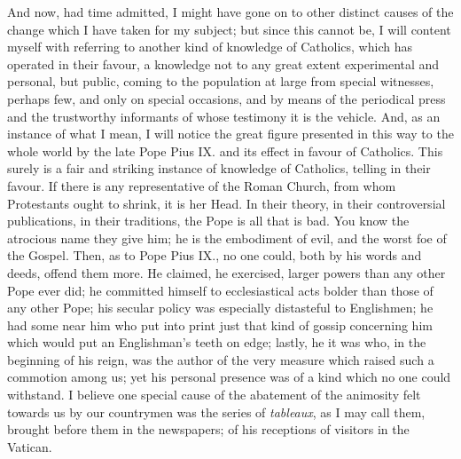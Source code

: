 And now, had time admitted, I might have gone on to other distinct
causes of the change which I have taken for my subject; but since this
cannot be, I will content myself with referring to another kind of
knowledge of Catholics, which has operated in their favour, a
knowledge not to any great extent experimental and personal, but
public, coming to the population at large from special witnesses,
perhaps few, and only on special occasions, and by means of the
periodical press and the trustworthy informants of whose testimony it
is the vehicle. And, as an instance of what I mean, I will notice the
great figure presented in this way to the whole world by the late Pope
Pius IX. and its effect in favour of Catholics. This surely is a fair
and striking instance of knowledge of Catholics, telling in their
favour. If there is any representative of the Roman Church, from whom
Protestants ought to shrink, it is her Head. In their theory, in their
controversial publications, in their traditions, the Pope is all that
is bad. You know the atrocious name they give him; he is the
embodiment of evil, and the worst foe of the Gospel. Then, as to Pope
Pius IX., no one could, both by his words and deeds, offend them more.
He claimed, he exercised, larger powers than any other Pope ever did;
he committed himself to ecclesiastical acts bolder than those of any
other Pope; his secular policy was especially distasteful to
Englishmen; he had some near him who put into print just that kind of
gossip concerning him which would put an Englishman's teeth on
edge; lastly, he it was who, in the beginning of his reign, was the
author of the very measure which raised such a commotion among us; yet
his personal presence was of a kind which no one could withstand. I
believe one special cause of the abatement of the animosity felt
towards us by our countrymen was the series of \emph{tableaux}, as I
may call them, brought before them in the newspapers; of his
receptions of visitors in the Vatican.

